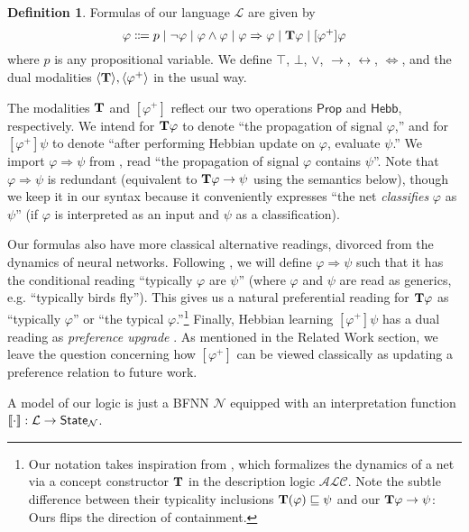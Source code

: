 \documentclass[letterpaper]{article}
\theoremstyle{definition}
\newtheorem{definition}{Definition}
\newcommand{\State}{\mbox{\sf State}}
\newcommand{\semantics}[1]{[\![\mbox{\em $ #1 $\/}]\!]}
\newcommand{\lang}{\mathcal{L}}
\newcommand{\Typ}{\textrm{\textup{\textbf{T}}}}
\newcommand{\Prop}{\textsf{Prop}}
\newcommand{\Hebb}{\textsf{Hebb}}
\newcommand{\Net}{\mathcal{N}}
\begin{document}
\begin{definition}  Formulas of our language $\lang$ are given by
\[
\varphi \Coloneqq p \mid \neg \varphi \mid \varphi \land \varphi \mid \varphi \Rightarrow \varphi \mid \Typ \varphi \mid [\varphi^+] \varphi
\]
where $p$ is any propositional variable.  We define $\top$, $\bot$, $\lor$, $\to$, $\leftrightarrow$, $\Leftrightarrow$, and the dual modalities $\langle \Typ \rangle, \langle \varphi^+ \rangle$ in the usual way.
\end{definition}

The modalities $\Typ$ and $[\varphi^+]$ reflect our two operations $\Prop$ and $\Hebb$, respectively.  We intend for $\Typ \varphi$ to denote ``the propagation of signal $\varphi$,'' and for $[\varphi^+] \psi$ to denote ``after performing Hebbian update on $\varphi$, evaluate $\psi$.''  We import ${\varphi \Rightarrow \psi}$ from \citep{leitgeb2001nonmonotonic}, read ``the propagation of signal $\varphi$ contains $\psi$''.  Note that ${\varphi \Rightarrow \psi}$ is redundant (equivalent to $\Typ \varphi \to \psi$ using the semantics below), though we keep it in our syntax because it conveniently expresses ``the net \emph{classifies} $\varphi$ as $\psi$'' (if $\varphi$ is interpreted as an input and $\psi$ as a classification).

Our formulas also have more classical alternative readings, divorced from the dynamics of neural networks.  Following \citep{leitgeb2001nonmonotonic}, we will define $\varphi \Rightarrow \psi$ such that it has the conditional reading ``typically $\varphi$ are $\psi$'' (where $\varphi$ and $\psi$ are read as generics, e.g. ``typically birds fly'').  This gives us a natural preferential reading for $\Typ \varphi$ as ``typically $\varphi$'' or ``the typical $\varphi$.''\footnote{Our notation takes inspiration from \citep{giordano2021}, which formalizes the dynamics of a net via a concept constructor $\Typ$ in the description logic $\mathcal{ALC}$.  Note the subtle difference between their typicality inclusions $\Typ(\varphi) \sqsubseteq \psi$ and our $\Typ \varphi \to \psi$: Ours flips the direction of containment.} 
Finally, Hebbian learning $[\varphi^+] \psi$ has a dual reading as \emph{preference upgrade}  \citep{van2007prefupgrade}.  As mentioned in the Related Work section, we leave the question concerning how $[\varphi^+]$ can be viewed classically as updating a preference relation to future work.

A model of our logic is just a BFNN $\Net$ equipped with an interpretation function $\semantics{\cdot} : \lang \to \State_\Net$.
\end{document}
